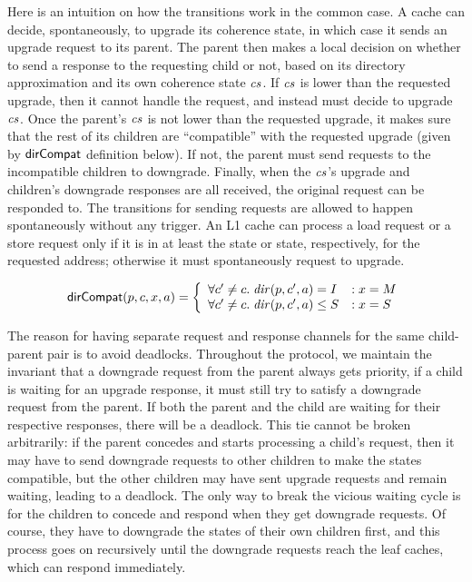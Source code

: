 
Here is an intuition on how the transitions work in the common case.  A cache
can decide, spontaneously, to upgrade its coherence state, in which case it
sends an upgrade request to its parent. The parent then makes a local decision
on whether to send a response to the requesting child or not, based on its
directory approximation and its own coherence state $\mathit{cs}$. If $\mathit{cs}$ is lower than
the requested upgrade, then it cannot handle the request, and instead must
decide to upgrade $\mathit{cs}$.  Once the parent's $\mathit{cs}$ is not lower than the requested
upgrade, it makes sure that the rest of its children are ``compatible'' with
the requested upgrade (given by $\mathsf{dirCompat}$ definition below).  If not, the
parent must send requests to the incompatible children to downgrade. Finally, when
the $\mathit{cs}$'s upgrade and children's downgrade responses are all received, the
original request can be responded to. The transitions for sending requests are
allowed to happen spontaneously without any trigger. An L1 cache can process a
load request or a store request only if it is in at least the \Sh{} state or
\Mo{} state, respectively, for the requested address; otherwise it must
spontaneously request to upgrade.

\begin{defn}
\begin{displaymath}
\mathsf{dirCompat}(p, c, x, a) = \left\{
\begin{array}{ll}
\forall c' \neq c. \; \mathit{dir}(p,c',a) = I &: x = M\\
\forall c' \neq c. \; \mathit{dir}(p,c',a) \le S &: x = S\\
\end{array}
\right.
\end{displaymath}
\end{defn}

The reason for having separate request and response channels for the same
child-parent pair is to avoid deadlocks. Throughout the protocol, we maintain
the invariant
that a downgrade request from the parent always gets priority, \ie{} if a child
is waiting for an upgrade response, it must still try to satisfy a downgrade
request from the parent. If both the parent and the child are waiting
for their respective responses, there will be a deadlock. This tie cannot
be broken arbitrarily: if the parent concedes and starts processing a child's
request, then it may have to send downgrade requests to other children to make
the states compatible, but the other children may have sent upgrade requests
and remain waiting, leading to a deadlock. The only way to break the
vicious waiting cycle is for the children to concede and respond when they get
downgrade requests. Of course, they have to downgrade the states of their own
children first, and this process goes on recursively until the downgrade requests
reach the leaf caches, which can respond immediately.

